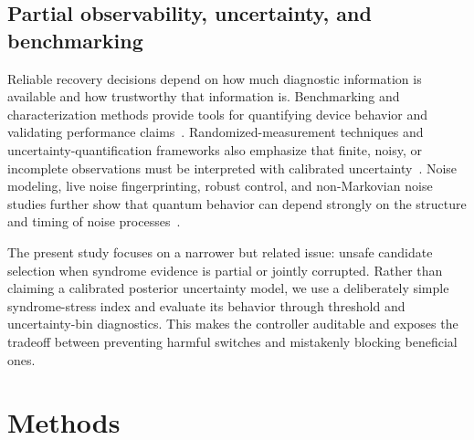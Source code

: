 \documentclass{iopjournal}
\begin{document}
\subsection{Partial observability, uncertainty, and benchmarking}

Reliable recovery decisions depend on how much diagnostic information is available and 
how trustworthy that information is. Benchmarking and characterization methods provide 
tools for quantifying device behavior and validating performance claims~\cite{Hashim2025BenchmarkingCharacterization}. 
Randomized-measurement techniques and uncertainty-quantification frameworks also emphasize 
that finite, noisy, or incomplete observations must be interpreted with calibrated uncertainty~\cite{Cieslinski2024RandomisedMeasurements,Bennink2026UncertaintyQuantificationQC}. 
Noise modeling, live noise fingerprinting, robust control, and non-Markovian noise studies 
further show that quantum behavior can depend strongly on the structure and timing of noise 
processes~\cite{Ji2026DataEfficientNoiseModeling,Bensoussan2025LiveNoiseFingerprinting,Ding2025UniversallyRobustControl,Cai2020RandomTelegraphDephasing,Zhang2024NonMarkovianTeleportation,Zhuang2026FluxoniumNonMarkovian}.

The present study focuses on a narrower but related issue: unsafe candidate selection 
when syndrome evidence is partial or jointly corrupted. Rather than claiming a calibrated 
posterior uncertainty model, we use a deliberately simple syndrome-stress index and evaluate 
its behavior through threshold and uncertainty-bin diagnostics. This makes the controller 
auditable and exposes the tradeoff between preventing harmful switches and mistakenly 
blocking beneficial ones.

\section{Methods}\label{sec:methods}
\end{document}
